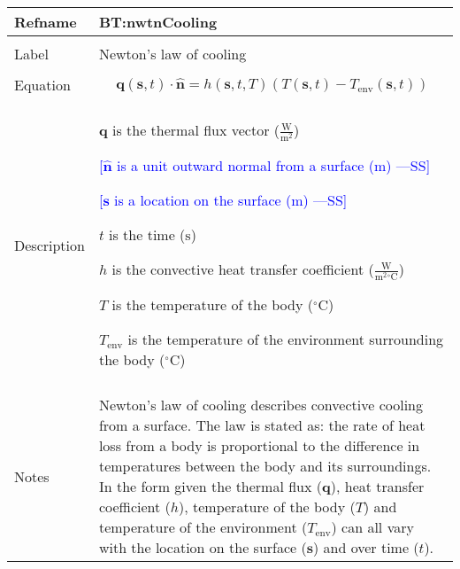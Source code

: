\documentclass[12pt]{article}
\newcommand{\authornote}[3]{\textcolor{#1}{[#3 ---#2]}}
\newcommand{\authornote}[3]{}
\newcommand{\wss}[1]{\authornote{blue}{SS}{#1}}
\begin{document}

\vspace{\baselineskip}
\noindent
\begin{minipage}{\textwidth}
\begin{tabular}{>{\raggedright}p{}>{\raggedright\arraybackslash}p{}}
\toprule \textbf{Refname} & \textbf{BT:nwtnCooling}
\label{BT:nwtnCooling}
\\ \midrule \\
Label & Newton's law of cooling
        
\\ \midrule \\
Equation & \begin{displaymath} 
        \textbf{q}\left(\textbf{s}, t\right) \cdot
        \symbf{\hat{n}} = h(\textbf{s}, t, T) (T(\textbf{s}, t) -
        T_{\text{env}}(\textbf{s}, t))
        \end{displaymath}
\\ \midrule \\
Description & \begin{symbDescription}
              \item{$\textbf{q}$ is the thermal flux vector ($\frac{\text{W}}{\text{m}^{2}}$)}
              \item \wss{$\symbf{\hat{n}}$ is a unit outward normal from a surface (${\text{m}}$)}
              \item \wss{$\textbf{s}$ is a location on the surface (${\text{m}}$)}
              \item{$t$ is the time (${\text{s}}$)}
              \item{$h$ is the convective heat transfer coefficient ($\frac{\text{W}}{\text{m}^{2}{}^{\circ}\text{C}}$)}
              \item{$T$ is the temperature of the body (${{}^{\circ}\text{C}}$)}
              \item{$T_{\text{env}}$ is the temperature of the environment surrounding the body (${{}^{\circ}\text{C}}$)}
              \end{symbDescription}
\\ \midrule \\
Notes & Newton's law of cooling describes convective cooling from a surface. The
law is stated as: the rate of heat loss from a body is proportional to the
difference in temperatures between the body and its surroundings.  In the form
given the thermal flux ($\textbf{q}$), heat transfer coefficient ($h$),
temperature of the body ($T$) and temperature of the environment
($T_\text{env}$) can all vary with the location on the surface ($\textbf{s}$)
and over time ($t$).


\end{tabular}
\end{minipage}
\end{document}
